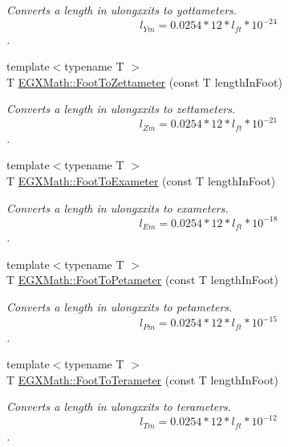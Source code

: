 \begin{DoxyCompactItemize}
\begin{DoxyCompactList}\small\item\em Converts a length in ulongxxits to yottameters. \[ l_{Ym}=0.0254 * 12 * l_{ft} * 10^{-24} \]. \end{DoxyCompactList}\item 
{\footnotesize template$<$typename T $>$ }\\T \mbox{\hyperlink{group___e_g_x_math-_conversions-_length_conversions-_imperial-_foot-_s_i_gab3fbbb8c19effbba293a76e2141b03be}{E\+G\+X\+Math\+::\+Foot\+To\+Zettameter}} (const T length\+In\+Foot)
\begin{DoxyCompactList}\small\item\em Converts a length in ulongxxits to zettameters. \[ l_{Zm}=0.0254 * 12 * l_{ft} * 10^{-21} \]. \end{DoxyCompactList}\item 
{\footnotesize template$<$typename T $>$ }\\T \mbox{\hyperlink{group___e_g_x_math-_conversions-_length_conversions-_imperial-_foot-_s_i_gaf2d43637b7f1ee964274c36ceeff93b2}{E\+G\+X\+Math\+::\+Foot\+To\+Exameter}} (const T length\+In\+Foot)
\begin{DoxyCompactList}\small\item\em Converts a length in ulongxxits to exameters. \[ l_{Em}=0.0254 * 12 * l_{ft} * 10^{-18} \]. \end{DoxyCompactList}\item 
{\footnotesize template$<$typename T $>$ }\\T \mbox{\hyperlink{group___e_g_x_math-_conversions-_length_conversions-_imperial-_foot-_s_i_ga6f7eedec51b5247e174460561bf4707b}{E\+G\+X\+Math\+::\+Foot\+To\+Petameter}} (const T length\+In\+Foot)
\begin{DoxyCompactList}\small\item\em Converts a length in ulongxxits to petameters. \[ l_{Pm}=0.0254 * 12 * l_{ft} * 10^{-15} \]. \end{DoxyCompactList}\item 
{\footnotesize template$<$typename T $>$ }\\T \mbox{\hyperlink{group___e_g_x_math-_conversions-_length_conversions-_imperial-_foot-_s_i_ga5ef1947187e98d3000e3c1eb836df0af}{E\+G\+X\+Math\+::\+Foot\+To\+Terameter}} (const T length\+In\+Foot)
\begin{DoxyCompactList}\small\item\em Converts a length in ulongxxits to terameters. \[ l_{Tm}=0.0254 * 12 * l_{ft} * 10^{-12} \]. \end{DoxyCompactList}\item 

\end{DoxyCompactItemize}
